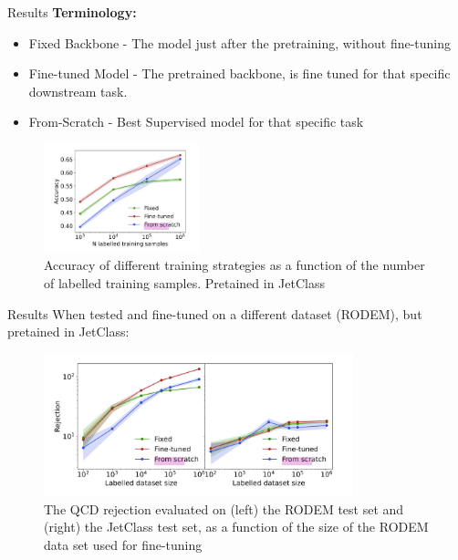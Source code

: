 \documentclass[10pt]{beamer}
\begin{document}
\begin{frame}{Results}
    \textbf{Terminology:}
    \begin{itemize}[<+->]
        \item Fixed Backbone - The model just after the pretraining, without
            fine-tuning
        \item Fine-tuned Model - The pretrained backbone, is fine tuned for
            that specific downstream task.
        \item From-Scratch - Best Supervised model for that specific task
    \end{itemize}

    \begin{figure}
        \includegraphics[width=0.4\textwidth]{plot1.jpeg}
        \caption{Accuracy of different training strategies as a
        function of the number of labelled training samples. Pretained in
    JetClass}
    \end{figure}
\end{frame}

\begin{frame}{Results}
    When tested and fine-tuned on a different dataset (RODEM), but pretained in
    JetClass:
    \begin{figure}
        \includegraphics[width=0.8\textwidth]{plot2.jpeg}
        \caption{The QCD rejection
        evaluated on (left) the RODEM test set and (right) the
    JetClass test set, as a function of the size of the RODEM
data set used for fine-tuning}
    \end{figure}
\end{frame}
\end{document}
